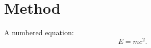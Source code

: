 \chapter{Method}
\label{ch:method}

A numbered equation:
\begin{equation}
  \label{eq:example}
  E = mc^2.
\end{equation}
